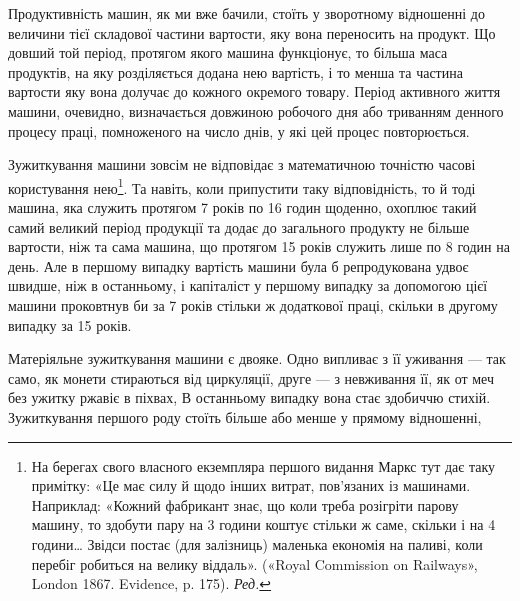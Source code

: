 Продуктивність машин, як ми вже бачили, стоїть у зворотному
відношенні до величини тієї складової частини вартости, яку вона
переносить на продукт. Що довший той період, протягом якого
машина функціонує, то більша маса продуктів, на яку розділяється
додана нею вартість, і то менша та частина вартости
яку вона долучає до кожного окремого товару. Період активного
життя машини, очевидно, визначається довжиною робочого дня
або триванням денного процесу праці, помноженого на число
днів, у які цей процес повторюється.

Зужиткування машини зовсім не відповідає з математичною
точністю часові користування нею\footnote*{
На берегах свого власного екземпляра першого видання Маркс
тут дає таку примітку: «Це має силу й щодо інших витрат, пов’язаних із
машинами. Наприклад: «Кожний фабрикант знає, що коли треба розігріти
парову машину, то здобути пару на 3 години коштує стільки ж саме,
скільки і на 4 години\dots{} Звідси постає (для залізниць) маленька економія
на паливі, коли перебіг робиться на велику віддаль». («Royal Commission
on Railways», London 1867. Evidence, p. 175). \emph{Ред.}
}. Та навіть, коли припустити
таку відповідність, то й тоді машина, яка служить протягом
7 років по 16 годин щоденно, охоплює такий самий великий
період продукції та додає до загального продукту не більше
вартости, ніж та сама машина, що протягом 15 років служить
лише по 8 годин на день. Але в першому випадку вартість машини
була б репродукована удвоє швидше, ніж в останньому, і капіталіст
у першому випадку за допомогою цієї машини проковтнув би
за 7  років стільки ж додаткової праці, скільки в другому випадку
за 15 років.

Матеріяльне зужиткування машини є двояке. Одно випливає
з її уживання — так само, як монети стираються від циркуляції,
друге — з невживання її, як от меч без ужитку ржавіє в піхвах,
В останньому випадку вона стає здобиччю стихій. Зужиткування
першого роду стоїть більше або менше у прямому відношенні,
\parbreak{}  %
